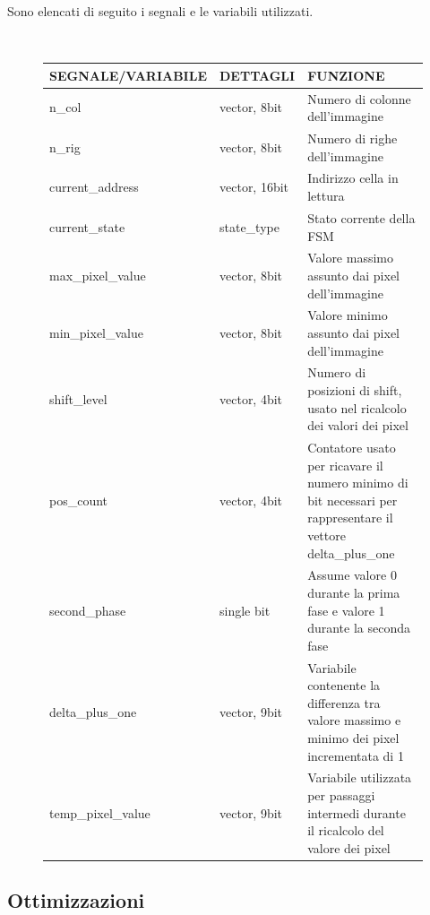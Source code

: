 \documentclass[11pt]{article}
\begin{document}
    Sono elencati di seguito i segnali e le variabili utilizzati.
    
    \renewcommand{\arraystretch}{1.1}
    \begin{figure}[h]
        \centering
        \tt
        \begin{tabular}{|p{}|p{}|p{}|}
            \hline
            SEGNALE/VARIABILE & DETTAGLI & FUNZIONE  \\
            \hline
            n\_col & vector, 8bit & Numero di colonne dell'immagine \\
            \hline
            n\_rig & vector, 8bit & Numero di righe dell'immagine \\
            \hline
            current\_address & vector, 16bit & Indirizzo cella in lettura \\
            \hline 
            current\_state & state\_type & Stato corrente della FSM \\
            \hline
            max\_pixel\_value & vector, 8bit & Valore massimo assunto dai pixel dell'immagine \\
            \hline
            min\_pixel\_value & vector, 8bit & Valore minimo assunto dai pixel dell'immagine \\
            \hline
            shift\_level & vector, 4bit & Numero di posizioni di shift, usato nel ricalcolo dei valori dei pixel \\
            \hline
            pos\_count & vector, 4bit & Contatore usato per ricavare il numero minimo di bit necessari per rappresentare il vettore delta\_plus\_one \\
            \hline
            second\_phase & single bit & Assume valore 0 durante la prima fase e valore 1 durante la seconda fase \\
            \hline
            delta\_plus\_one & vector, 9bit & Variabile contenente la differenza tra valore massimo e minimo dei pixel incrementata di 1  \\
            \hline
            temp\_pixel\_value & vector, 9bit & Variabile utilizzata per passaggi intermedi durante il ricalcolo del valore dei pixel \\
            \hline
        \end{tabular}
    \end{figure}
    
    \subsection{Ottimizzazioni}
    
\end{document}
